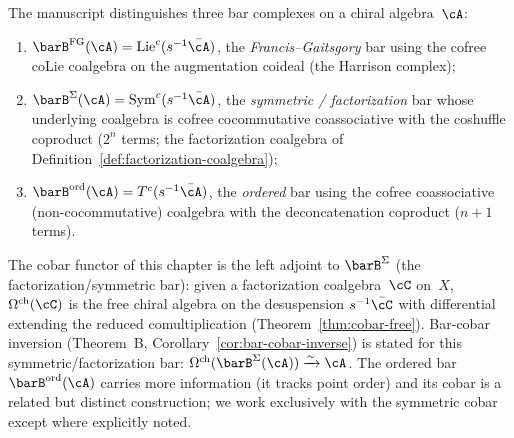 \begin{remark}
\label{rem:cobar-which-bar}
The manuscript distinguishes three bar complexes on a chiral
algebra~$\cA$:
\begin{enumerate}[label=\textup{(\roman*)}]
\item $\barB^{\mathrm{FG}}(\cA) = \mathrm{Lie}^c(s^{-1}\bar{\cA})$, the
 \emph{Francis--Gaitsgory} bar using the cofree coLie
 coalgebra on the augmentation coideal (the Harrison complex);
\item $\barB^{\Sigma}(\cA) = \mathrm{Sym}^c(s^{-1}\bar{\cA})$, the
 \emph{symmetric / factorization} bar whose underlying
 coalgebra is cofree cocommutative coassociative with the
 coshuffle coproduct ($2^n$ terms; the factorization coalgebra of
 Definition~\ref{def:factorization-coalgebra});
\item $\barB^{\mathrm{ord}}(\cA) = T^c(s^{-1}\bar{\cA})$, the
 \emph{ordered} bar using the cofree coassociative
 (non-cocommutative) coalgebra with the deconcatenation
 coproduct ($n+1$ terms).
\end{enumerate}
The cobar functor of this chapter is the left adjoint to
$\barB^{\Sigma}$ (the factorization/symmetric bar): given a
factorization coalgebra~$\cC$ on~$X$, $\Omegach(\cC)$ is the free
chiral algebra on the desuspension $s^{-1}\bar{\cC}$ with
differential extending the reduced comultiplication
(Theorem~\ref{thm:cobar-free}). Bar-cobar inversion
(Theorem~B, Corollary~\ref{cor:bar-cobar-inverse}) is stated for
this symmetric/factorization bar: $\Omegach(\barB^{\Sigma}(\cA))
\xrightarrow{\sim} \cA$. The ordered bar $\barB^{\mathrm{ord}}(\cA)$
carries more information (it tracks point order) and its cobar is a
related but distinct construction; we work exclusively with the
symmetric cobar except where explicitly noted.
\end{remark}

